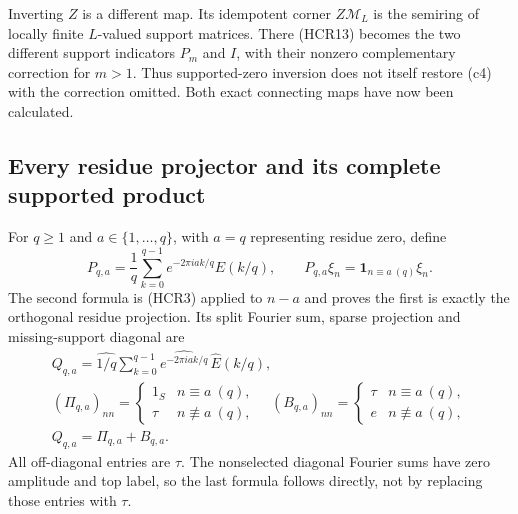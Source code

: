 Inverting $Z$ is a different map. Its idempotent corner
$Z\mathscr M_L$ is the semiring of locally finite $L$-valued
support matrices. There (HCR13) becomes the two different
support indicators $P_m$ and $I$, with their nonzero
complementary correction for $m>1$. Thus supported-zero
inversion does not itself restore (c4) with the correction
omitted. Both exact connecting maps have now been calculated.

\subsection{Every residue projector and its complete supported product}

For $q\ge1$ and $a\in\{1,\ldots,q\}$, with $a=q$
representing residue zero, define
\begin{equation}\tag{HCR18}
 P_{q,a}=\frac1q\sum_{k=0}^{q-1}
            e^{-2\pi i ak/q}E(k/q),\qquad
 P_{q,a}\xi_n=\mathbf1_{n\equiv a\ (q)}\xi_n.
\end{equation}
The second formula is (HCR3) applied to $n-a$ and proves
the first is exactly the orthogonal residue projection.
Its split Fourier sum, sparse projection and missing-support
diagonal are
\begin{equation}\tag{HCR19}
\begin{gathered}
 Q_{q,a}=\widehat{1/q}\sum_{k=0}^{q-1}
       \widehat{e^{-2\pi i ak/q}}\,\widehat E(k/q),\\
 (\Pi_{q,a})_{nn}=
       \begin{cases}1_S&n\equiv a\ (q),\\\tau&n\not\equiv a\ (q),\end{cases}
 \quad
 (B_{q,a})_{nn}=
       \begin{cases}\tau&n\equiv a\ (q),\\e&n\not\equiv a\ (q),\end{cases}\\
 \boxed{Q_{q,a}=\Pi_{q,a}+B_{q,a}.}
\end{gathered}
\end{equation}
All off-diagonal entries are $\tau$. The nonselected
diagonal Fourier sums have zero amplitude and top label,
so the last formula follows directly, not by replacing
those entries with $\tau$.

